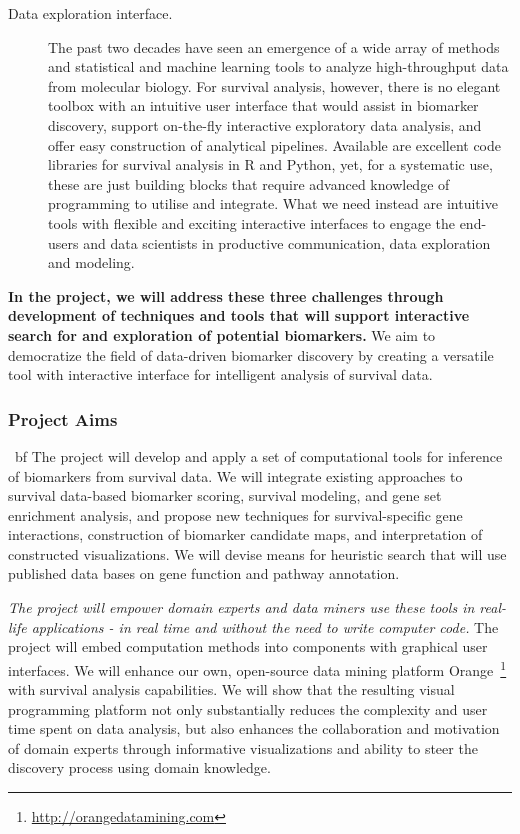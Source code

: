 \documentclass[11pt,a4paper]{article}
\renewcommand{\bold}{\textbf}
\begin{document}
\begin{description}
	\item[Data exploration interface.] The past two decades have seen an emergence of a wide array of methods and statistical and machine learning tools to analyze high-throughput data from molecular biology. For survival analysis, however, there is no elegant toolbox with an intuitive user interface that would assist in biomarker discovery, support on-the-fly interactive exploratory data analysis, and offer easy construction of analytical pipelines. Available are excellent code libraries for survival analysis in R and Python, yet, for a systematic use, these are just building blocks that require advanced knowledge of programming to utilise and integrate. What we need instead are intuitive tools with flexible and exciting interactive interfaces to engage the end-users and data scientists in productive communication, data exploration and modeling.
\end{description}

\bold{ In the project, we will address these three challenges through development of techniques and tools that will support interactive search for and exploration of potential biomarkers.} We aim to democratize the field of data-driven biomarker discovery by creating a versatile tool with interactive interface for intelligent analysis of survival data.

\subsubsection*{Project Aims}

{\ bf The project will develop and apply a set of computational tools for inference of biomarkers from survival data.} We will integrate existing approaches to survival data-based biomarker scoring, survival modeling, and gene set enrichment analysis, and propose new techniques for survival-specific gene interactions, construction of biomarker candidate maps, and interpretation of constructed visualizations. We will devise means for heuristic search that will use published data bases on gene function and pathway annotation.

{\em The project will empower domain experts and data miners use these tools in real-life applications - in real time and without the need to write computer code.} The project will embed computation methods into components with graphical user interfaces. We will enhance our own, open-source data mining platform Orange~\footnote{\url{http://orangedatamining.com}} with survival analysis capabilities. We will show that the resulting visual programming platform not only substantially reduces the complexity and user time spent on data analysis, but also enhances the collaboration and motivation of domain experts through informative visualizations and ability to steer the discovery process using domain knowledge. 
\end{document}
